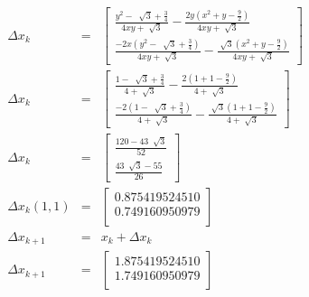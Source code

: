 \documentclass[a4paper]{article}
\begin{document}
\begin{eqnarray*}
\Delta x_{k} & = & \begin{bmatrix}
\frac{y^{2} - \ \sqrt[]{3}+\frac{3}{4}}{4xy + \sqrt[]{3}} - \frac{2y(x^{2} + y - \frac{9}{2})}{4xy + \sqrt[]{3}}\\
\frac{-2x(y^{2} - \ \sqrt[]{3} +\frac{3}{4})}{4xy + \sqrt[]{3}} - \frac{\sqrt[]{3}(x^{2} + y - \frac{9}{2})}{4xy + \sqrt[]{3}}
\end{bmatrix}\\
\Delta x_{k} & = & \begin{bmatrix}
\frac{1 - \ \sqrt[]{3}+\frac{3}{4}}{4 + \sqrt[]{3}} - \frac{2(1 + 1 - \frac{9}{2})}{4 + \sqrt[]{3}}\\
\frac{-2(1 - \ \sqrt[]{3} +\frac{3}{4})}{4 + \sqrt[]{3}} - \frac{\sqrt[]{3}(1 + 1 - \frac{9}{2})}{4 + \sqrt[]{3}}
\end{bmatrix}\\
\Delta x_{k} & = & \begin{bmatrix}
\frac{120-43\ \sqrt[]{3}}{52}\\
\frac{43\ \sqrt[]{3}-55}{26}
\end{bmatrix}\\
\Delta x_{k}(1,1) & = & \begin{bmatrix}
0.875419524510\\
0.749160950979\\
\end{bmatrix}\\
\Delta x_{k+1} & = & x_{k}+\Delta x_{k}\\
\Delta x_{k+1} & = & \begin{bmatrix}
1.875419524510\\
1.749160950979\\
\end{bmatrix}
\end{eqnarray*}
\end{document}
